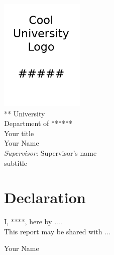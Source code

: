\documentclass[a4paper,11pt,oneside]{book}
\begin{document}
 
    \frontmatter
    
    \begin{titlepage}      
        \begin{center}
            \includegraphics[width=0.3\textwidth]{figures/uni-logo.png}\\[0.5cm]
            {\LARGE *** University\\[0.5cm]
            Department of ******}\\[2cm]
            \linespread{1.2}\huge {
                Your title
            }
            \linespread{1}~\\[2cm]
            {\Large 
                Your Name
            }\\[1cm] 

            {\large 
                \emph{Supervisor:} Supervisor's name}\\[1cm]
            
            \large subtitle \\[0.3cm] 
            \vfill
            
            \date{September 2022}
        \end{center}
    \end{titlepage}

    \newpage
    \thispagestyle{empty}
    \chapter*{\Large Declaration}
        I, ****, here by .... \\
    \noindent
    This report may be shared with ...
    ~\\[1cm]
    \begin{flushright}
        Your Name
    \date{September 2022}
    \end{flushright}

    
   
       
    
    \tableofcontents
    \listoffigures
    
    \mainmatter
    
    
    
    \printbibliography[heading=bibintoc,title={References}]
\end{document}

